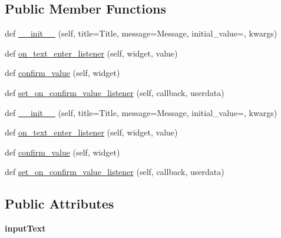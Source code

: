 \subsection*{Public Member Functions}
\begin{DoxyCompactItemize}
\item 
def \hyperlink{classremi_1_1gui_1_1InputDialog_afd73c84c493d65a00f8ff444102ae2cc}{\+\_\+\+\_\+init\+\_\+\+\_\+} (self, title=\textquotesingle{}Title\textquotesingle{}, message=\textquotesingle{}Message\textquotesingle{}, initial\+\_\+value=\textquotesingle{}\textquotesingle{}, kwargs)
\item 
def \hyperlink{classremi_1_1gui_1_1InputDialog_a61b1845d77de3df8dfc27f67b33c617c}{on\+\_\+text\+\_\+enter\+\_\+listener} (self, widget, value)
\item 
def \hyperlink{classremi_1_1gui_1_1InputDialog_a65b20b4e39fdd759fbd47ea081a9b3cd}{confirm\+\_\+value} (self, widget)
\item 
def \hyperlink{classremi_1_1gui_1_1InputDialog_a54fbc140f28297132cf4e7f4a0663e82}{set\+\_\+on\+\_\+confirm\+\_\+value\+\_\+listener} (self, callback, userdata)
\item 
def \hyperlink{classremi_1_1gui_1_1InputDialog_afd73c84c493d65a00f8ff444102ae2cc}{\+\_\+\+\_\+init\+\_\+\+\_\+} (self, title=\textquotesingle{}Title\textquotesingle{}, message=\textquotesingle{}Message\textquotesingle{}, initial\+\_\+value=\textquotesingle{}\textquotesingle{}, kwargs)
\item 
def \hyperlink{classremi_1_1gui_1_1InputDialog_a61b1845d77de3df8dfc27f67b33c617c}{on\+\_\+text\+\_\+enter\+\_\+listener} (self, widget, value)
\item 
def \hyperlink{classremi_1_1gui_1_1InputDialog_a65b20b4e39fdd759fbd47ea081a9b3cd}{confirm\+\_\+value} (self, widget)
\item 
def \hyperlink{classremi_1_1gui_1_1InputDialog_a54fbc140f28297132cf4e7f4a0663e82}{set\+\_\+on\+\_\+confirm\+\_\+value\+\_\+listener} (self, callback, userdata)
\end{DoxyCompactItemize}
\subsection*{Public Attributes}
\begin{DoxyCompactItemize}
\item 
{\bfseries input\+Text}\hypertarget{classremi_1_1gui_1_1InputDialog_a7c1d36c3c62dffbd128d79d5c589de13}{}\label{classremi_1_1gui_1_1InputDialog_a7c1d36c3c62dffbd128d79d5c589de13}

\end{DoxyCompactItemize}
